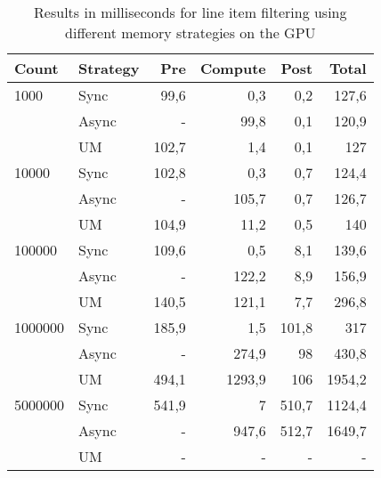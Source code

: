 \documentclass[a4paper,titlepage]{article}
\begin{document}
\begin{table}
\begin{tabular}{l l r r r r}
\toprule
\textbf{Count} & \textbf{Strategy} &\textbf{Pre} & \textbf{Compute} & \textbf{Post} & \textbf{Total}\\
\midrule
1000    & Sync  &  99,6  &  0,3    & 0,2   & 127,6 \\
        & Async &  -     & 99,8    & 0,1   & 120,9 \\
        & UM    &  102,7 &  1,4    & 0,1   & 127 \\
10000   & Sync  &  102,8 &  0,3    & 0,7   & 124,4 \\
        & Async &  -     & 105,7   & 0,7   & 126,7 \\
        & UM    &  104,9 &  11,2   & 0,5   & 140 \\
100000  & Sync  &  109,6 &  0,5    & 8,1   & 139,6 \\
        & Async &  -     & 122,2   & 8,9   & 156,9 \\
        & UM    &  140,5 &  121,1  & 7,7   & 296,8 \\
1000000 & Sync  &  185,9 &  1,5    & 101,8 & 317 \\
        & Async &  -     & 274,9   & 98    & 430,8 \\
        & UM    &  494,1 &  1293,9 & 106   & 1954,2 \\
5000000 & Sync  &  541,9 &  7      & 510,7 & 1124,4 \\
        & Async &  -     & 947,6   & 512,7 & 1649,7 \\
        & UM    &  -     & -       & -     & - \\
\bottomrule
\end{tabular}
\caption{Results in milliseconds for line item filtering using different memory strategies on the GPU}
\label{tbl:line-item-strategies}
\end{table}
\end{document}
